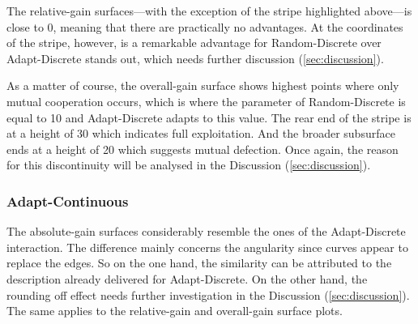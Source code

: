 \documentclass[11pt]{article}
\begin{document}
		The relative-gain surfaces---with the exception of the stripe highlighted above---is close to 0, meaning that there are practically no advantages.
		At the coordinates of the stripe, however, is a remarkable advantage for Random-Discrete over Adapt-Discrete stands out, which needs further discussion (\ref{sec:discussion}).

		As a matter of course, the overall-gain surface shows highest points where only mutual cooperation occurs, which is where the parameter of Random-Discrete is equal to 10 and Adapt-Discrete adapts to this value.
		The rear end of the stripe is at a height of 30 which indicates full exploitation.
		And the broader subsurface ends at a height of 20 which suggests mutual defection.
		Once again, the reason for this discontinuity will be analysed in the Discussion (\ref{sec:discussion}). 

\subsubsection*{Adapt-Continuous}
		The absolute-gain surfaces considerably resemble the ones of the Adapt-Discrete interaction.
		The difference mainly concerns the angularity since curves appear to replace the edges.
		So on the one hand, the similarity can be attributed to the description already delivered for Adapt-Discrete.
		On the other hand, the rounding off effect needs further investigation in the Discussion (\ref{sec:discussion}).
		The same applies to the relative-gain and overall-gain surface plots.\\

	
\end{document}
